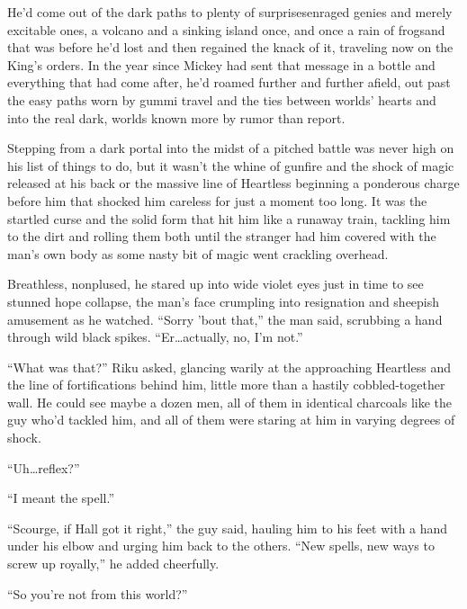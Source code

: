 \begin{sloppypar}
He'd come out of the dark paths to plenty of surprises\textemdash enraged genies and merely excitable ones, a volcano and a sinking island once, and once a rain of frogs\textemdash and that was before he'd lost and then regained the knack of it, traveling now on the King's orders. In the year since Mickey had sent that message in a bottle and everything that had come after, he'd roamed further and further afield, out past the easy paths worn by gummi travel and the ties between worlds' hearts and into the real dark, worlds known more by rumor than report.
\end{sloppypar}
\begin{sloppypar}
Stepping from a dark portal into the midst of a pitched battle was never high on his list of things to do, but it wasn't the whine of gunfire and the shock of magic released at his back or the massive line of Heartless beginning a ponderous charge before him that shocked him careless for just a moment too long. It was the startled curse and the solid form that hit him like a runaway train, tackling him to the dirt and rolling them both until the stranger had him covered with the man's own body as some nasty bit of magic went crackling overhead.
\end{sloppypar}
Breathless, nonplused, he stared up into wide violet eyes just in time to see stunned hope collapse, the man's face crumpling into resignation and sheepish amusement as he watched.
``Sorry 'bout that,'' the man said, scrubbing a hand through wild black spikes. ``Er\ldots actually, no, I'm not.''

``What was that?'' Riku asked, glancing warily at the approaching Heartless and the line of fortifications behind him, little more than a hastily cobbled-together wall. He could see maybe a dozen men, all of them in identical charcoals like the guy who'd tackled him, and all of them were staring at him in varying degrees of shock.

``Uh\ldots reflex?''

``I meant the spell.''

``Scourge, if Hall got it right,'' the guy said, hauling him to his feet with a hand under his elbow and urging him back to the others. ``New spells, new ways to screw up royally,'' he added cheerfully.

``So you're not from this world?''

